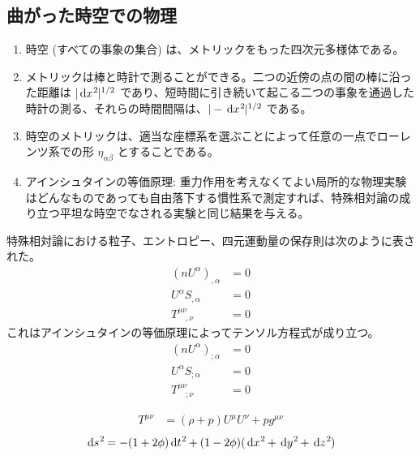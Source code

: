\documentclass[uplatex,dvipdfmx,a4paper,11pt]{jlreq}
\theoremstyle{definition}
\begin{document}
\subsection{曲がった時空での物理}
\begin{enumerate}
  \item 時空 (すべての事象の集合) は、メトリックをもった四次元多様体である。
  \item メトリックは棒と時計で測ることができる。二つの近傍の点の間の棒に沿った距離は $|\dl{x}^2|^{1/2}$ であり、短時間に引き続いて起こる二つの事象を通過した時計の測る、それらの時間間隔は、$|-\dl{x}^2|^{1/2}$ である。
  \item 時空のメトリックは、適当な座標系を選ぶことによって任意の一点でローレンツ系での形 $\eta_{\alpha\beta}$ とすることである。
  \item アインシュタインの等価原理: 重力作用を考えなくてよい局所的な物理実験はどんなものであっても自由落下する慣性系で測定すれば、特殊相対論の成り立つ平坦な時空でなされる実験と同じ結果を与える。
\end{enumerate}

特殊相対論における粒子、エントロピー、四元運動量の保存則は次のように表された。
\begin{align}
  (nU^\alpha)_{,\alpha}  & = 0 \\
  U^\alpha S_{,\alpha}   & = 0 \\
  T^{\mu\nu}_{\quad,\nu} & = 0
\end{align}
これはアインシュタインの等価原理によってテンソル方程式が成り立つ。
\begin{align}
  (nU^\alpha)_{;\alpha}  & = 0 \\
  U^\alpha S_{;\alpha}   & = 0 \\
  T^{\mu\nu}_{\quad;\nu} & = 0
\end{align}

\begin{align}
  T^{\mu\nu} & = (\rho + p)U^\mu U^\nu + pg^{\mu\nu}
\end{align}
\begin{align}
  \dl{s}^2 = -(1 + 2\phi)\dl{t}^2 + (1 - 2\phi)(\dl{x}^2 + \dl{y}^2 + \dl{z}^2)
\end{align}
\end{document}
